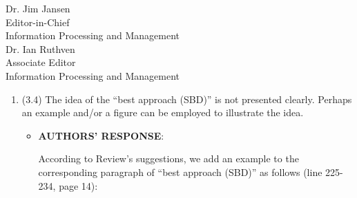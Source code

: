 \documentclass[11pt]{letter} %
\begin{document}
\begin{letter}{Dr. Jim Jansen \\
			Editor-in-Chief  \\
			Information Processing and Management\\
			Dr. Ian Ruthven \\
			Associate Editor \\
			Information Processing and Management}
\begin{enumerate}
\begin{itemize}
				To explain Figure 4 more clearly, 
				we revised the figure (shown in revised manuscript) and 
				added explanation of undefined notations to the caption of Figure 4 as follows:
				
				\hspace*{0.6cm}
				``
				This figure shows the progress of generating summary at test. The circles denote the
				candidate words (choices) in vocabulary, 
				which are sorted by the probability of being selected in
				descending order. Each circle at level $l$ has $N$ choices 
				at level $l+1$. $N$ is the number of words in vocabulary. 
				The number in circles is the order of these choices according to the
				probability. The generation order is from level 1 (top) to level 3 (bottom).
				''
				(page 13)

				\hspace*{0.6cm}
				The corresponding paragraph of Figure 4 are change as
				``
				However, this is sub-optimal 
				because the parents of the current top b choices may not include all
				the top b choices at the parent level. 
                Here b is the beam size.
				As shown in Figure 4, suppose that level 3 is the beginning of the repeated segment,
				the first choices at level 1 and 2 are excluded by beam search.

				\hspace*{0.6cm}
				An alternative approach (SBD-b2) backtracks all the way until the current top b
				choices all share the same prefix token sequence. ... 
				While this algorithm backtracks further and may include better
				choices, it doesn't completely solve the problem of SBD-b1.
				As shown in Figure 4, suppose that level 3 is the beginning of the repeated segment
				and the second candidate word in level 1 is the only prefix token sequence 
				of top b choices in level 2,
				the first and third choices at level 1 are excluded by beam search
				after generating words based on second choice in level 1.
				''
				(line 208-221, page 13-14)
			\end{itemize}
			\item 
			(3.4) The idea of the ``best approach (SBD)'' is not presented clearly. Perhaps an example and/or a figure can be employed to illustrate the idea.
			\begin{itemize}
				\item[] \textbf{AUTHORS' RESPONSE}: 
				
				According to Review's suggestions, we add an example to the corresponding paragraph
				of ``best approach (SBD)'' as follows (line 225-234, page 14):


\end{itemize}
\end{enumerate}
\end{letter}
\end{document}
